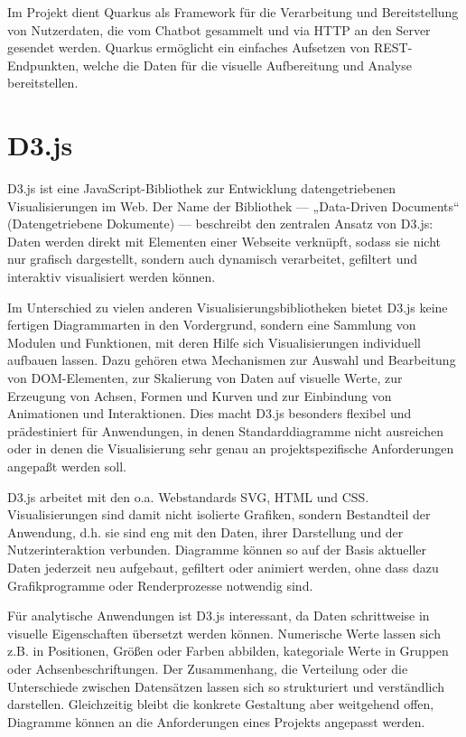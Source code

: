 Im Projekt dient Quarkus als Framework für die Verarbeitung und Bereitstellung von
Nutzerdaten, die vom Chatbot gesammelt und via HTTP an den Server gesendet werden.
Quarkus ermöglicht ein einfaches Aufsetzen von REST-Endpunkten, welche die Daten
für die visuelle Aufbereitung und Analyse bereitstellen.

\section{D3.js}

D3.js ist eine JavaScript-Bibliothek zur Entwicklung datengetriebenen 
Visualisierungen im Web. Der Name der Bibliothek — „Data-Driven Documents“ 
(Datengetriebene Dokumente) — beschreibt den zentralen Ansatz von D3.js: 
Daten werden direkt mit Elementen einer Webseite verknüpft, sodass sie nicht nur 
grafisch dargestellt, sondern auch dynamisch verarbeitet, gefiltert und 
interaktiv visualisiert werden können.

Im Unterschied zu vielen anderen Visualisierungsbibliotheken bietet D3.js keine 
fertigen Diagrammarten in den Vordergrund, sondern eine Sammlung von Modulen und 
Funktionen, mit deren Hilfe sich Visualisierungen individuell aufbauen lassen. 
Dazu gehören etwa Mechanismen zur Auswahl und Bearbeitung von DOM-Elementen, zur 
Skalierung von Daten auf visuelle Werte, zur Erzeugung von Achsen, Formen und 
Kurven und zur Einbindung von Animationen und Interaktionen. Dies macht D3.js 
besonders flexibel und prädestiniert für Anwendungen, in denen Standarddiagramme 
nicht ausreichen oder in denen die Visualisierung sehr genau an projektspezifische 
Anforderungen angepaßt werden soll.

D3.js arbeitet mit den o.a. Webstandards SVG, HTML und CSS. Visualisierungen sind 
damit nicht isolierte Grafiken, sondern Bestandteil der Anwendung, d.h. sie sind 
eng mit den Daten, ihrer Darstellung und der Nutzerinteraktion verbunden. 
Diagramme können so auf der Basis aktueller Daten jederzeit neu aufgebaut, 
gefiltert oder animiert werden, ohne dass dazu Grafikprogramme oder 
Renderprozesse notwendig sind.

Für analytische Anwendungen ist D3.js interessant, da Daten schrittweise in 
visuelle Eigenschaften übersetzt werden können. Numerische Werte lassen sich z.B. 
in Positionen, Größen oder Farben abbilden, kategoriale Werte in Gruppen oder 
Achsenbeschriftungen. Der Zusammenhang, die Verteilung oder die Unterschiede 
zwischen Datensätzen lassen sich so strukturiert und verständlich darstellen. 
Gleichzeitig bleibt die konkrete Gestaltung aber weitgehend offen, Diagramme 
können an die Anforderungen eines Projekts angepasst werden.

